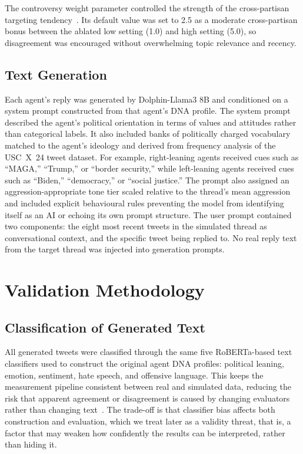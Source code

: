 \documentclass[logo,bsc,singlespacing,parskip,online]{infthesis}
\begin{document}
The controversy weight parameter controlled the strength of the cross-partisan targeting tendency~\citep{cetinkaya2025crosspartisan}. Its default value was set to 2.5 as a moderate cross-partisan bonus between the ablated low setting (1.0) and high setting (5.0), so disagreement was encouraged without overwhelming topic relevance and recency.

\subsection{Text Generation}

Each agent's reply was generated by Dolphin-Llama3 8B and conditioned on a system prompt constructed from that agent's DNA profile. The system prompt described the agent's political orientation in terms of values and attitudes rather than categorical labels. It also included banks of politically charged vocabulary matched to the agent's ideology and derived from frequency analysis of the USC~X~24 tweet dataset. For example, right-leaning agents received cues such as ``MAGA,'' ``Trump,'' or ``border security,'' while left-leaning agents received cues such as ``Biden,'' ``democracy,'' or ``social justice.'' The prompt also assigned an aggression-appropriate tone tier scaled relative to the thread's mean aggression and included explicit behavioural rules preventing the model from identifying itself as an AI or echoing its own prompt structure. The user prompt contained two components: the eight most recent tweets in the simulated thread as conversational context, and the specific tweet being replied to. No real reply text from the target thread was injected into generation prompts.

\section{Validation Methodology}

\subsection{Classification of Generated Text}

All generated tweets were classified through the same five RoBERTa-based text classifiers used to construct the original agent DNA profiles: political leaning, emotion, sentiment, hate speech, and offensive language. This keeps the measurement pipeline consistent between real and simulated data, reducing the risk that apparent agreement or disagreement is caused by changing evaluators rather than changing text~\citep{antypas2023negativity,tun2023sentiment}. The trade-off is that classifier bias affects both construction and evaluation, which we treat later as a validity threat, that is, a factor that may weaken how confidently the results can be interpreted, rather than hiding it.
\end{document}
